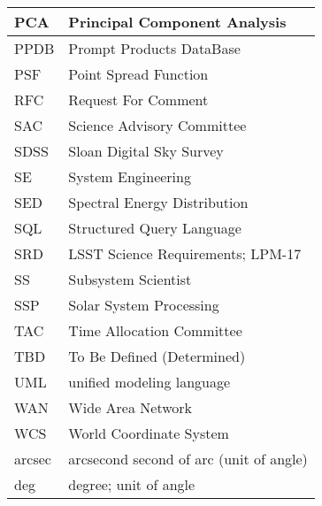 \begin{longtable}{p{}p{}}
PCA & Principal Component Analysis \\\hline
PPDB & Prompt Products DataBase \\\hline
PSF & Point Spread Function \\\hline
RFC & Request For Comment \\\hline
SAC & Science Advisory Committee \\\hline
SDSS & Sloan Digital Sky Survey \\\hline
SE & System Engineering \\\hline
SED & Spectral Energy Distribution \\\hline
SQL & Structured Query Language \\\hline
SRD & LSST Science Requirements; LPM-17 \\\hline
SS & Subsystem Scientist \\\hline
SSP & Solar System Processing \\\hline
TAC & Time Allocation Committee \\\hline
TBD & To Be Defined (Determined) \\\hline
UML & unified modeling language \\\hline
WAN & Wide Area Network \\\hline
WCS & World Coordinate System \\\hline
arcsec & arcsecond second of arc (unit of angle) \\\hline
deg & degree; unit of angle \\\hline
\end{longtable}
